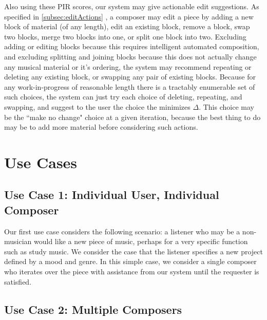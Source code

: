 \documentclass[final,authoryear,5p,times,twocolumn]{elsarticle}
\begin{document}
Also using these PIR scores, our system may give actionable edit suggestions. As specified in \ref{subsec:editActions} , a composer may edit a piece by adding a new block of material (of any length), edit an existing block, remove a block, swap two blocks, merge two blocks into one, or split one block into two. Excluding adding or editing blocks because this requires intelligent automated composition, and excluding splitting and joining blocks because this does not actually change any musical material or it's ordering, the system may recommend repeating or deleting any existing block, or swapping any pair of existing blocks. Because for any work-in-progress of reasonable length there is a tractably enumerable set of such choices, the system can just try each choice of deleting, repeating, and swapping, and suggest to the user the choice the minimizes $\Delta$. This choice may be the ``make no change" choice at a given iteration, because the best thing to do may be to add more material before considering such actions.

\section{Use Cases}

\subsection{Use Case 1: Individual User, Individual Composer}

Our first use case considers the following scenario: a listener who may be a non-musician would like a new piece of music, perhaps for a very specific function such as study music. We consider the case that the listener specifies a new project defined by a mood and genre. In this simple case, we consider a single composer who iterates over the piece with assistance from our system until the requester is satisfied.

\subsection{Use Case 2: Multiple Composers}
\end{document}
